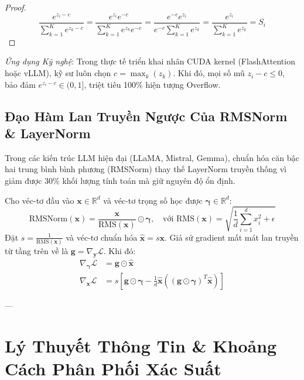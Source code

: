 \begin{proof}
\begin{equation*}
\frac{e^{z_i - c}}{\sum_{k=1}^K e^{z_k - c}} = \frac{e^{z_i} e^{-c}}{\sum_{k=1}^K e^{z_k} e^{-c}} = \frac{e^{-c} e^{z_i}}{e^{-c} \sum_{k=1}^K e^{z_k}} = \frac{e^{z_i}}{\sum_{k=1}^K e^{z_k}} = S_i
\end{equation*}
\end{proof}

\textit{Ứng dụng Kỹ nghệ}: Trong thực tế triển khai nhân CUDA kernel (FlashAttention hoặc vLLM), kỹ sư luôn chọn $c = \max_k(z_k)$. Khi đó, mọi số mũ $z_i - c \le 0$, bảo đảm $e^{z_i - c} \in (0, 1]$, triệt tiêu 100\% hiện tượng Overflow.

\subsection{Đạo Hàm Lan Truyền Ngược Của RMSNorm \& LayerNorm}

Trong các kiến trúc LLM hiện đại (LLaMA, Mistral, Gemma), chuẩn hóa căn bậc hai trung bình bình phương (RMSNorm) thay thế LayerNorm truyền thống vì giảm được $30\%$ khối lượng tính toán mà giữ nguyên độ ổn định.

Cho véc-tơ đầu vào $\mathbf{x} \in \mathbb{R}^d$ và véc-tơ trọng số học được $\mathbf{\gamma} \in \mathbb{R}^d$:
\begin{equation}
\text{RMSNorm}(\mathbf{x}) = \frac{\mathbf{x}}{\text{RMS}(\mathbf{x})} \odot \mathbf{\gamma}, \quad \text{với } \text{RMS}(\mathbf{x}) = \sqrt{\frac{1}{d} \sum_{i=1}^d x_i^2 + \epsilon}
\end{equation}
Đặt $s = \frac{1}{\text{RMS}(\mathbf{x})}$ và véc-tơ chuẩn hóa $\hat{\mathbf{x}} = s \mathbf{x}$. Giả sử gradient mất mát lan truyền từ tầng trên về là $\mathbf{g} = \nabla_{\mathbf{y}} \mathcal{L}$. Khi đó:
\begin{align}
\nabla_{\mathbf{\gamma}} \mathcal{L} &= \mathbf{g} \odot \hat{\mathbf{x}} \\
\nabla_{\mathbf{x}} \mathcal{L} &= s \left[ \mathbf{g} \odot \mathbf{\gamma} - \frac{1}{d} \hat{\mathbf{x}} \left( (\mathbf{g} \odot \mathbf{\gamma})^T \hat{\mathbf{x}} \right) \right]
\end{align}

---

\section{Lý Thuyết Thông Tin \& Khoảng Cách Phân Phối Xác Suất}
\label{sec:app-math-info-theory}

